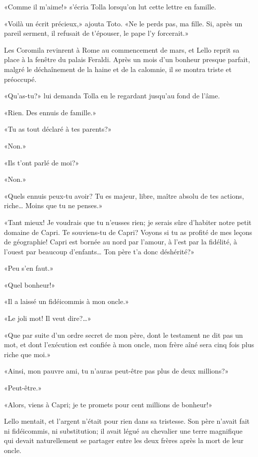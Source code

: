 «Comme il m'aime!» s'écria Tolla lorsqu'on lut cette lettre en famille.

«Voilà un écrit précieux,» ajouta Toto. «Ne le perds pas, ma fille. Si,
après un pareil serment, il refusait de t'épouser, le pape l'y
forcerait.»

Les Coromila revinrent à Rome au commencement de mars, et Lello reprit
sa place à la fenêtre du palais Feraldi. Après un mois d'un bonheur
presque parfait, malgré le déchaînement de la haine et de la calomnie,
il se montra triste et préoccupé.

«Qu'as-tu?» lui demanda Tolla en le regardant jusqu'au fond de l'âme.

«Rien. Des ennuis de famille.»

«Tu as tout déclaré à tes parents?»

«Non.»

«Ils t'ont parlé de moi?»

«Non.»

«Quels ennuis peux-tu avoir? Tu es majeur, libre, maître absolu de tes
actions, riche\ldots{} Moins que tu ne penses.»

«Tant mieux! Je voudrais que tu n'eusses rien; je serais sûre d'habiter
notre petit domaine de Capri. Te souviens-tu de Capri? Voyons si tu as
profité de mes leçons de géographie! Capri est bornée au nord par
l'amour, à l'est par la fidélité, à l'ouest par beaucoup
d'enfants\ldots{} Ton père t'a donc déshérité?»

«Peu s'en faut.»

«Quel bonheur!»

«Il a laissé un fidéicommis à mon oncle.»

«Le joli mot! Il veut dire?\ldots»

«Que par suite d'un ordre secret de mon père, dont le testament ne dit
pas un mot, et dont l'exécution est confiée à mon oncle, mon frère aîné
sera cinq fois plus riche que moi.»

«Ainsi, mon pauvre ami, tu n'auras peut-être pas plus de deux millions?»

«Peut-être.»

«Alors, viens à Capri; je te promets pour cent millions de bonheur!»

Lello mentait, et l'argent n'était pour rien dans sa tristesse. Son père
n'avait fait ni fidéicommis, ni substitution; il avait légué au
chevalier une terre magnifique qui devait naturellement se partager
entre les deux frères après la mort de leur oncle.

